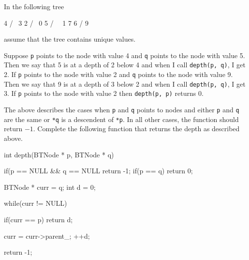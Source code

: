 \nextq
In the following tree
\begin{console}[fontsize=\footnotesize]
        4
       / \
      3   2
         / \
        0   5
       / \   \
      1   7   6
         /
        9
\end{console}
assume that the tree contains unique values.
\begin{enumerate}[nosep]
\li
Suppose \verb!p! points to the node with value 4
and \verb!q! points to the node with value 5.
Then we say that 5 is at a depth of 2 below 4
and when I call \verb!depth(p, q)!, I get 2.
\li
If \verb!p! points to the node with value 2
and \verb!q! points to the node with value 9.
Then we say that 9 is at a depth of 3 below 2
and when I call \verb!depth(p, q)!, I get 3.
\li
If \verb!p! points to the node with value 2
then \verb!depth(p, p)! returns 0.
\end{enumerate}
The above describes the cases when
\verb!p! and \verb!q! points to nodes
and either \verb!p! and \verb!q! are the same
or \verb!*q! is a descendent of \verb!*p!.
In all other cases, the function should return $-1$.
Complete the following function that returns the depth
as described above.
\\
\ANSWER
\begin{answercode}
int depth(BTNode * p, BTNode * q)
{
  if(p == NULL && q == NULL
      return -1;
  if(p == q)
      return 0;

  BTNode * curr = q;
  int d = 0;

  while(curr != NULL)
  {
      if(curr == p)
         return d;

      curr = curr->parent_;
      ++d;
  }

  return -1;
}
\end{answercode}

